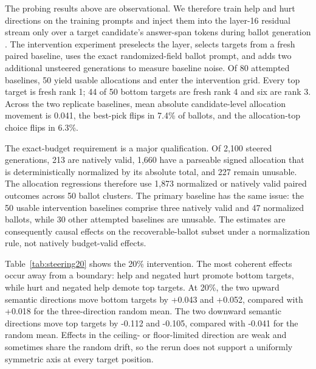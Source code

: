 \documentclass[11pt]{article}
\begin{document}
The probing results above are observational. We therefore train help and hurt
directions on the training prompts and inject them into the layer-16 residual
stream only over a target candidate's answer-span tokens during ballot
generation \cite{turner2023activation}. The intervention experiment preselects the layer,
selects targets from a fresh paired baseline, uses the exact randomized-field
ballot prompt, and adds two additional unsteered generations to measure
baseline noise. Of 80 attempted baselines, 50 yield usable allocations and
enter the intervention grid. Every top target is fresh rank 1; 44 of 50 bottom
targets are fresh rank 4 and six are rank 3. Across the two replicate
baselines, mean absolute candidate-level allocation movement is 0.041, the
best-pick flips in 7.4\% of ballots, and the allocation-top choice flips in
6.3\%.

The exact-budget requirement is a major qualification. Of 2{,}100 steered
generations, 213 are natively valid, 1{,}660 have a parseable signed allocation
that is deterministically normalized by its absolute total, and 227 remain
unusable. The allocation regressions therefore use 1{,}873 normalized or
natively valid paired outcomes across 50 ballot clusters. The primary baseline
has the same issue: the 50 usable intervention baselines comprise three
natively valid and 47 normalized ballots, while 30 other attempted baselines
are unusable. The estimates are consequently causal effects on the
recoverable-ballot subset under a normalization rule, not natively budget-valid
effects.

Table~\ref{tab:steering20} shows the 20\% intervention. The most coherent
effects occur away from a boundary: help and negated hurt promote bottom
targets, while hurt and negated help demote top targets. At 20\%, the two
upward semantic directions move bottom targets by +0.043 and +0.052, compared
with +0.018 for the three-direction random mean. The two downward semantic
directions move top targets by -0.112 and -0.105, compared with -0.041 for the
random mean. Effects in the ceiling- or floor-limited direction are weak and
sometimes share the random drift, so the rerun does not support a uniformly
symmetric axis at every target position.
\end{document}
